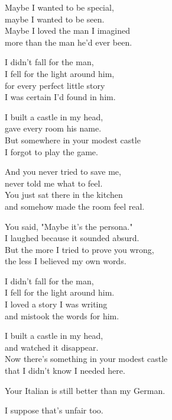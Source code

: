 \begin{lyrics}

Maybe I wanted to be special,\\
maybe I wanted to be seen.\\
Maybe I loved the man I imagined\\
more than the man he'd ever been.


I didn't fall for the man,\\
I fell for the light around him,\\
for every perfect little story\\
I was certain I'd found in him.

I built a castle in my head,\\
gave every room his name.\\
But somewhere in your modest castle\\
I forgot to play the game.


And you never tried to save me,\\
never told me what to feel.\\
You just sat there in the kitchen\\
and somehow made the room feel real.

You said, "Maybe it's the persona."\\
I laughed because it sounded absurd.\\
But the more I tried to prove you wrong,\\
the less I believed my own words.


I didn't fall for the man,\\
I fell for the light around him.\\
I loved a story I was writing\\
and mistook the words for him.

I built a castle in my head,\\
and watched it disappear.\\
Now there's something in your modest castle\\
that I didn't know I needed here.


Your Italian is still better than my German.

I suppose that's unfair too.
\end{lyrics}

